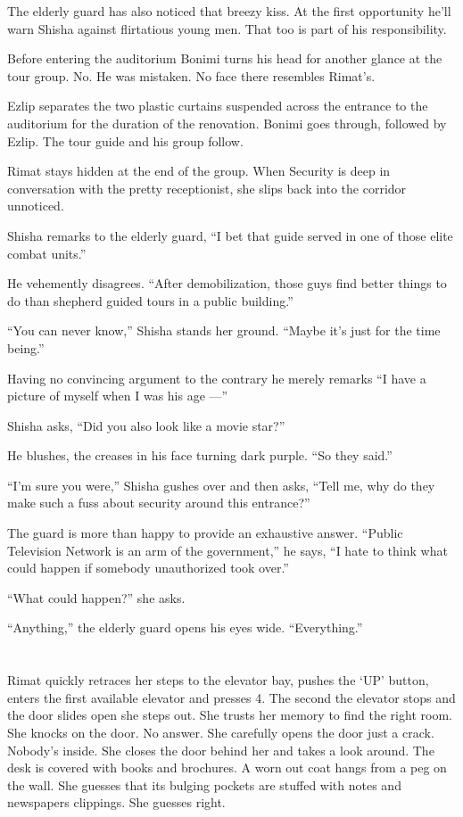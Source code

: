 \documentclass[twoside,11pt,openany]{book}
\begin{document}
The elderly guard has also noticed that breezy kiss. \MakeUppercase{A}t the first opportunity he'll warn Shisha against
flirtatious young men. That too is part of his responsibility.

Before entering the auditorium Bonimi turns his head for another glance at the tour group. No. He was mistaken. No
face there resembles Rimat's.

Ezlip separates the two plastic curtains suspended across the entrance to the auditorium for the duration of the
renovation. Bonimi goes through, followed by Ezlip. The tour guide and his group follow.

Rimat stays hidden at the end of the group. When Security is deep in conversation with the pretty receptionist, she
slips back into the corridor unnoticed.

Shisha remarks to the elderly guard, ``I bet that guide served in one of those elite combat
units.''

He vehemently disagrees. ``After demobilization, those guys find better things to do than shepherd guided
tours in a public building.''

``You can never know,'' Shisha stands her ground. ``Maybe it's just for the time
being.''

Having no convincing argument to the contrary he merely remarks ``I have a picture of myself when I was his
age ---''

Shisha asks, ``Did you also look like a movie star?''

He blushes, the creases in his face turning dark purple. ``So they said.''

``I'm sure you were,'' Shisha gushes over and then asks, ``Tell me, why do they
make such a fuss about security around this entrance?''

The guard is more than happy to provide an exhaustive answer.
\linebreak[3]
``Public Television Network is an arm of
the government,'' he says, ``I hate to think what could happen if somebody unauthorized took
over.''

``What could happen?'' she asks.

``Anything,'' the elderly guard opens his eyes wide.
``Everything.''



\chapter{}

Rimat quickly retraces her steps to the elevator bay, pushes the `UP' button, enters the first available elevator and
presses 4. The second the elevator stops and the door slides open she steps out. She trusts her memory to find the
right room. She knocks on the door. No answer. She carefully opens the door just a crack. Nobody's inside. She closes
the door behind her and takes a look around. The desk is covered with books and brochures. A worn out coat hangs from
a peg on the wall. She guesses that its bulging pockets are stuffed with notes and{ }newspapers
clippings. She guesses right.
\end{document}
